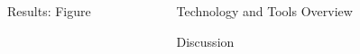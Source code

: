 \documentclass{beamer} %
\begin{document}
\begin{frame}[t]
\begin{columns}[t]
\begin{column}{0.3\textwidth}

			\begin{block}{Results: Figure}
			\end{block}


		\end{column} %

		\begin{column}{0.03\textwidth}\end{column} %

		\begin{column}{0.3\textwidth}


			\begin{block}{Technology and Tools Overview}
			\end{block}


			\begin{block}{Discussion}
			\end{block}


		\end{column}

		\begin{column}{0.03\textwidth}\end{column} %

		\begin{column}{0.3\textwidth} %



\end{column}
\end{columns}
\end{frame}
\end{document}
